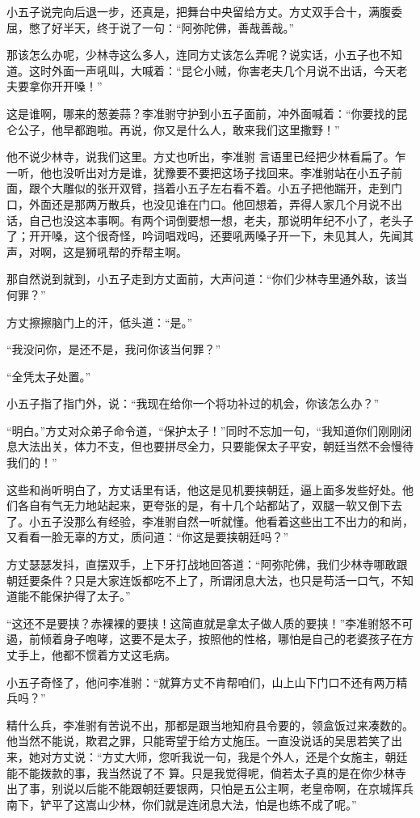 小五子说完向后退一步，还真是，把舞台中央留给方丈。方丈双手合十，满腹委屈，憋了好半天，终于说了一句：“阿弥陀佛，善哉善哉。”

那该怎么办呢，少林寺这么多人，连同方丈该怎么弄呢？说实话，小五子也不知道。这时外面一声吼叫，大喊着：“昆仑小贼，你害老夫几个月说不出话，今天老夫要拿你开开嗓！”

这是谁啊，哪来的葱姜蒜？李准驸守护到小五子面前，冲外面喊着：“你要找的昆仑公子，他早都跑啦。再说，你又是什么人，敢来我们这里撒野！”

他不说少林寺，说我们这里。方丈也听出，李准驸
言语里已经把少林看扁了。乍一听，他也没听出对方是谁，犹豫要不要把这场子找回来。李准驸站在小五子前面，跟个大雕似的张开双臂，挡着小五子左右看不着。小五子把他踹开，走到门口，外面还是那两万散兵，也没见谁在门口。他回想着，弄得人家几个月说不出话，自己也没这本事啊。有两个词倒要想一想，老夫，那说明年纪不小了，老头子了；开开嗓，这个很奇怪，吟词唱戏吗，还要吼两嗓子开一下，未见其人，先闻其声，对啊，这是狮吼帮的乔帮主啊。

那自然说到就到，小五子走到方丈面前，大声问道：“你们少林寺里通外敌，该当何罪？”

方丈擦擦脑门上的汗，低头道：“是。”

“我没问你，是还不是，我问你该当何罪？”

“全凭太子处置。”

小五子指了指门外，说：“我现在给你一个将功补过的机会，你该怎么办？”

“明白。”方丈对众弟子命令道，“保护太子！”同时不忘加一句，“我知道你们刚刚闭息大法出关，体力不支，但也要拼尽全力，只要能保太子平安，朝廷当然不会慢待我们的！”

这些和尚听明白了，方丈话里有话，他这是见机要挟朝廷，逼上面多发些好处。他们各自有气无力地站起来，更夸张的是，有十几个站都站了，双腿一软又倒下去了。小五子没那么有经验，李准驸自然一听就懂。他看着这些出工不出力的和尚，又看看一脸无辜的方丈，质问道：“你这是要挟朝廷吗？”

方丈瑟瑟发抖，直摆双手，上下牙打战地回答道：“阿弥陀佛，我们少林寺哪敢跟朝廷要条件？只是大家连饭都吃不上了，所谓闭息大法，也只是苟活一口气，不知道能不能保护得了太子。”

“这还不是要挟？赤裸裸的要挟！这简直就是拿太子做人质的要挟！”李准驸怒不可遏，前倾着身子咆哮，这要不是太子，按照他的性格，哪怕是自己的老婆孩子在方丈手上，他都不惯着方丈这毛病。

小五子奇怪了，他问李准驸：“就算方丈不肯帮咱们，山上山下门口不还有两万精兵吗？”

精什么兵，李准驸有苦说不出，那都是跟当地知府县令要的，领盒饭过来凑数的。他当然不能说，欺君之罪，只能寄望于给方丈施压。一直没说话的吴思若笑了出来，她对方丈说：“方丈大师，您听我说一句，我是个外人，还是个女施主，朝廷能不能拨款的事，我当然说了不
算。只是我觉得呢，倘若太子真的是在你少林寺出了事，别说以后能不能跟朝廷要银两，只怕是五公主啊，老皇帝啊，在京城挥兵南下，铲平了这嵩山少林，你们就是连闭息大法，怕是也练不成了呢。”

